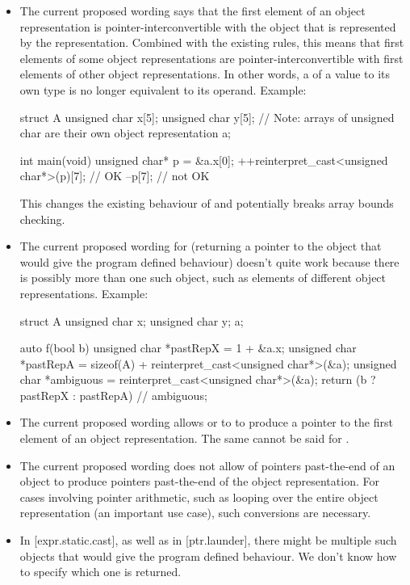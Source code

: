 \begin{itemize}
  \item The current proposed wording says that the first element of an object representation is pointer-interconvertible with the object that is represented by the representation. Combined with the existing rules, this means that first elements of some object representations are pointer-interconvertible with first elements of other object representations. In other words, a  of a value to its own type is no longer equivalent to its operand. Example:
  \begin{codeblock}
struct A {
  unsigned char x[5];
  unsigned char y[5];
  // Note: arrays of unsigned char are their own object representation
} a;

int main(void) {
  unsigned char* p = &a.x[0];
  ++reinterpret_cast<unsigned char*>(p)[7]; // OK
  --p[7]; // not OK
}
  \end{codeblock}

  This changes the existing behaviour of  and potentially breaks array bounds checking.

  \item The current proposed wording for  (returning a pointer to the object that would give the program defined behaviour) doesn’t quite work because there is possibly more than one such object, such as elements of different object representations. Example:

  \begin{codeblock}
struct A {
  unsigned char x;
  unsigned char y;
} a;

auto f(bool b) {
  unsigned char *pastRepX = 1 + &a.x;
  unsigned char *pastRepA = sizeof(A) + reinterpret_cast<unsigned char*>(&a);
  unsigned char *ambiguous = reinterpret_cast<unsigned char*>(&a);
  return (b ? pastRepX : pastRepA) // ambiguous;
}
  \end{codeblock}

  \item The current proposed wording allows  or  to \mbox{} to produce a pointer to the first element of an object representation. The same cannot be said for .

  \item The current proposed wording does not allow  of pointers past-the-end of an object to produce pointers past-the-end of the object representation. For cases involving pointer arithmetic, such as looping over the entire object representation (an important use case), such conversions are necessary.

  \item In [expr.static.cast], as well as in [ptr.launder], there might be multiple such objects that would give the program defined behaviour. We don't know how to specify which one is returned.

\end{itemize}


